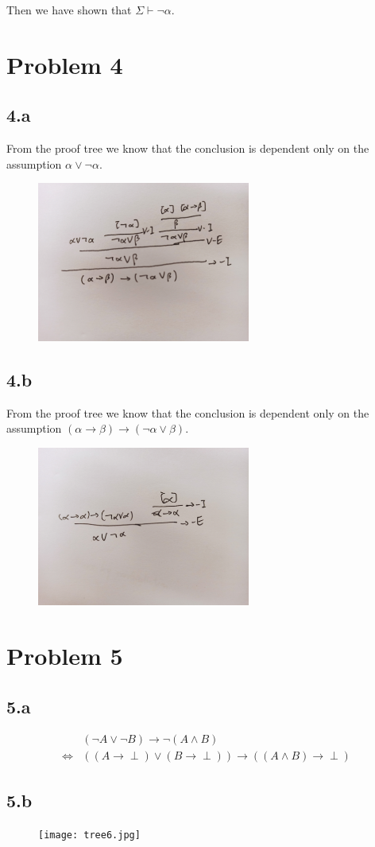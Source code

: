 \documentclass{article}
\begin{document}
Then we have shown that $\Sigma \vdash \neg\alpha$.

\section*{Problem 4}

\subsection*{4.a}

From the proof tree we know that the conclusion is dependent only on the assumption $\alpha \lor \neg\alpha$.
\begin{figure}[htbp]
	\centering
	\includegraphics[width=7cm]{tree4.jpg}
\end{figure}

\subsection*{4.b}

From the proof tree we know that the conclusion is dependent only on the assumption $(\alpha \to \beta) \to (\neg\alpha \lor \beta)$.
\begin{figure}[htbp]
	\centering
	\includegraphics[width=7cm]{tree5.jpg}
\end{figure}


\section*{Problem 5}

\subsection*{5.a}

\begin{align*}
	&(\neg A \lor \neg B) \to \neg ( A \land B )
	\\
	\Leftrightarrow &
	((A \to \perp) \lor (B \to \perp)) \to ((A \land B) \to \perp)
\end{align*}

\subsection*{5.b}

\begin{figure}[htbp]
	\centering
	\texttt{[image: tree6.jpg]}
\end{figure}
\end{document}
